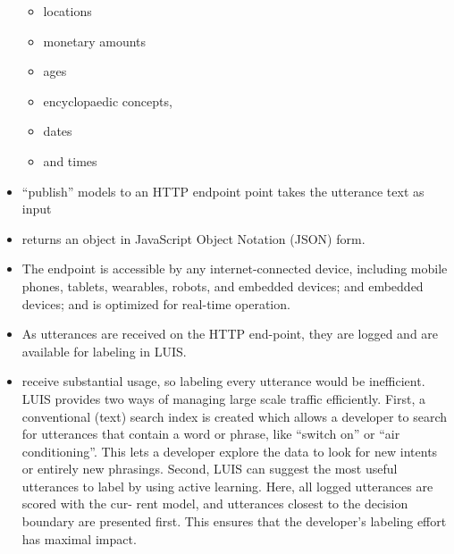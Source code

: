 \begin{itemize}
\begin{itemize}
				\item locations
				\item monetary amounts
				\item ages
				\item encyclopaedic concepts,
				\item dates
				\item and times
			\end{itemize}
		\item “publish” models to an HTTP endpoint point takes the utterance text as input
		\item returns an object in JavaScript Object Notation (JSON) form.
		\item The endpoint is accessible by any internet-connected device, including mobile phones, tablets, wearables, robots, and embedded devices; and embedded devices; and is optimized for real-time operation.
		\item As utterances are received on the HTTP end-point, they are logged and are available for labeling in LUIS. 
		\item receive substantial usage, so labeling every utterance would be inefficient. LUIS provides two
			ways of managing large scale traffic efficiently.
				First, a conventional (text) search index is created
				which allows a developer to search for utterances
				that contain a word or phrase, like “switch on” or
				“air conditioning”. This lets a developer explore
				the data to look for new intents or entirely new
				phrasings. Second, LUIS can suggest the most
				useful utterances to label by using active learning.
				Here, all logged utterances are scored with the cur-
				rent model, and utterances closest to the decision
				boundary are presented first. This ensures that the
				developer’s labeling effort has maximal impact.
	\end{itemize}
